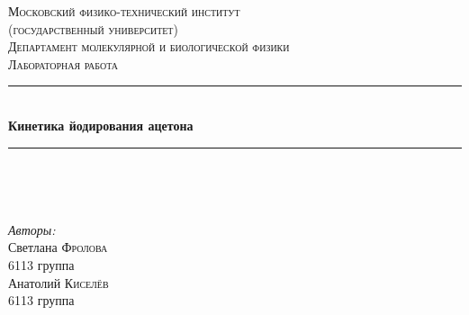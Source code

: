 \documentclass[a4paper, 12pt]{article}
\begin{document}
\begin{titlepage}

\newcommand{\HRule}{\rule{\linewidth}{0.5mm}} %

\center %
 

\textsc{\LARGE Московский физико-технический институт\\(государственный университет)}\\[1,5cm] %
\textsc{\Large Департамент молекулярной и биологической физики}\\[2cm] %
\textsc{\large Лабораторная работа}\\[0.5cm] %


\HRule
\\[0.4cm]
{ \huge \bfseries Кинетика йодирования ацетона}
\\[0.2cm] %
\HRule
\\[1.5cm]


 
\begin{minipage}{0.4\textwidth}
	\begin{flushleft}		
	\end{flushleft}
\end{minipage}
~
\begin{minipage}{0.4\textwidth}
	\begin{flushright} \large
		\emph{Авторы:}\\
		Светлана \textsc{Фролова} \\
		6113 группа \\
		Анатолий \textsc{Киселёв} \\
		6113 группа
	\end{flushright}
\end{minipage}



\end{titlepage}
\end{document}
